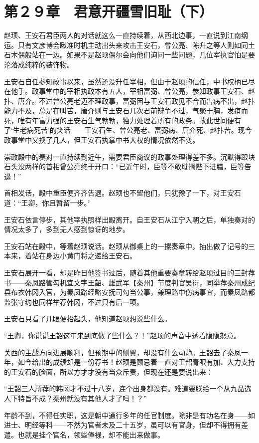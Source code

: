 \section{第２９章　君意开疆雪旧耻（下）}

赵顼、王安石君臣两人的对话就这么一直持续着，从西北边事，一直说到江南纲运。只有文彦博会瞅准时机主动出头来攻击王安石，曾公亮、陈升之等人则如同土石木偶般站在一边。如果不是赵顼偶尔会向他们询问一些问题，几位宰执官怕是要沦落成纯粹的装饰物。

王安石自任参知政事以来，虽然还没升任宰相，但由于赵顼的信任，中书权柄已尽在他手。政事堂中的宰相执政本有五人，宰相富弼、曾公亮，参知政事王安石、赵抃、唐介。不过曾公亮老迈不理政事，富弼因与王安石政见不合而告病不出，赵抃能力不及，总是在叫苦，唐介则与王安石几次君前辩争不过，气聚于胸，发疽而死，唯有年富力强的王安石生气勃勃，独力处理着所有的政务。故此世间便有了‘生老病死苦’的笑话——王安石生、曾公亮老、富弼病、唐介死、赵抃苦。现今政事堂中又换了几人，但王安石执掌中书大权的情况依然不变。

崇政殿中的奏对一直持续到近午，需要君臣商议的政事处理得差不多。沉默得跟块石头没两样的首相曾公亮终于开口：“已近午时，臣等不敢耽搁陛下进膳，臣等告退！”

首相发话，殿中重臣便齐齐告退。赵顼也不留他们，只犹豫了一下，对王安石道：“王卿，你且暂留一步。”

王安石依言停步，其他宰执照样出殿离开。自王安石从江宁入朝之后，单独奏对的情况太多了，多到无人感到惊讶的地步。

王安石站在殿中，等着赵顼说话。赵顼从御桌上的一摞奏章中，抽出做了记号的三本来，着站在身边小黄门将之递给王安石。

王安石展开一看，却是昨日他签书过后，随着其他重要奏章转给赵顼过目的三封荐书——秦凤路管勾机宜文字王韶、雄武军【秦州】节度判官吴衍，同举荐秦州成纪县布衣韩冈入官，为秦凤路经略安抚司勾当公事，兼理路中伤病事宜，而秦凤路都监张守约也同样举荐韩冈，不过只有后一项。

王安石只看了几眼便抬起头，他知道赵顼想说些什么。

“王卿，你说说王韶这年来到底做了些什么？！”赵顼的声音中透着隐隐怒意。

关西的主战方向进展顺利，但预期中的侧翼，却没有什么动静。王韶去了秦凤一年，如今给出的成绩却是一份荐书！赵顼是顾忌着一直对王韶青眼有加、大力支持的王安石的脸面，所以方才才没有当众斥责，但现在还是要说出来：

“王韶三人所荐的韩冈才不过十八岁，连个出身都没有。难道要朕给一个从九品选人下特旨不成？秦州就没有其他人才了吗！？”

年龄不到，不得任实职，这是朝中通行多年的任官制度。除非是有功名在身——如进士、明经等科——不然为官者未及二十五岁，虽可以有官身，但却不得拥有差遣。也就是挂个官名，领些俸禄，却不能出来做事。

